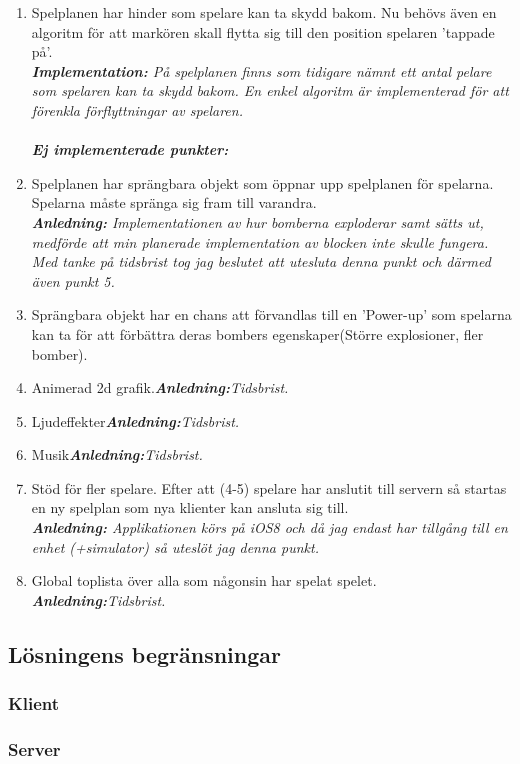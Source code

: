 \documentclass[10pt, titlepage, oneside, a4paper]{article}
\begin{document}
\begin{enumerate}
			
			\item Spelplanen har hinder som spelare kan ta skydd bakom. Nu behövs även en algoritm för att markören skall flytta sig till den position spelaren 'tappade på'.\\\textit{\textbf{Implementation:} På spelplanen finns som tidigare nämnt ett antal pelare som spelaren kan ta skydd bakom. En enkel algoritm är implementerad för att förenkla förflyttningar av spelaren.}
			\\\\\textit{\textbf{Ej implementerade punkter:}}
			\item Spelplanen har sprängbara objekt som öppnar upp spelplanen för spelarna. Spelarna måste spränga sig fram till varandra.\\\textit{\textbf{Anledning:} Implementationen av hur bomberna exploderar samt sätts ut, medförde att min planerade implementation av blocken inte skulle fungera. Med tanke på tidsbrist tog jag beslutet att utesluta denna punkt och därmed även punkt 5.}
			\item Sprängbara objekt har en chans att förvandlas till en 'Power-up' som spelarna kan ta för att förbättra deras bombers egenskaper(Större explosioner, fler bomber).
			\item Animerad 2d grafik.\textit{\textbf{Anledning:}Tidsbrist.}
			\item Ljudeffekter\textit{\textbf{Anledning:}Tidsbrist.}
			\item Musik\textit{\textbf{Anledning:}Tidsbrist.}
			\item Stöd för fler spelare. Efter att (4-5) spelare har anslutit till servern så startas en ny spelplan som nya klienter kan ansluta sig till.\\\textit{\textbf{Anledning:} Applikationen körs på iOS8 och då jag endast har tillgång till en enhet (+simulator) så uteslöt jag denna punkt.}
			\item Global toplista över alla som någonsin har spelat spelet.\\\textit{\textbf{Anledning:}Tidsbrist.}
		\end{enumerate}
    	\subsection{Lösningens begränsningar}
    		\subsubsection{Klient}
    		\subsubsection{Server}
\end{document}
